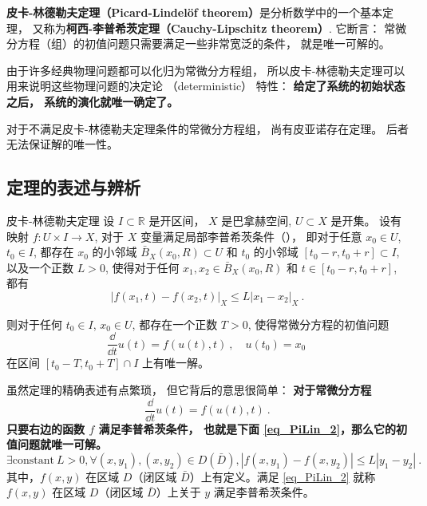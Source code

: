 
\textbf{皮卡-林德勒夫定理（Picard-Lindelöf theorem）}是分析数学中的一个基本定理， 又称为\textbf{柯西-李普希茨定理（Cauchy-Lipschitz theorem）}. 它断言： 常微分方程（组）的初值问题只需要满足一些非常宽泛的条件， 就是唯一可解的。 

由于许多经典物理问题都可以化归为常微分方程组， 所以皮卡-林德勒夫定理可以用来说明这些物理问题的决定论 （deterministic） 特性： \textbf{给定了系统的初始状态之后， 系统的演化就唯一确定了。}

对于不满足皮卡-林德勒夫定理条件的常微分方程组， 尚有皮亚诺存在定理。 后者无法保证解的唯一性。

\subsection{定理的表述与辨析}
\begin{theorem}{皮卡-林德勒夫定理}
设 $I\subset\mathbb{R}$ 是开区间， $X$ 是巴拿赫空间, $U\subset X$ 是开集。 设有映射 $f:U\times I\to X$, 对于 $X$ 变量满足局部李普希茨条件（）， 即对于任意 $x_0\in U$, $t_0\in I$, 都存在 $x_0$ 的小邻域 $\bar B_X(x_0,R)\subset U$ 和 $t_0$ 的小邻域 $[t_0-r,t_0+r]\subset I$, 以及一个正数 $L>0$, 使得对于任何 $x_1,x_2\in \bar B_X(x_0,R)$ 和 $t\in[t_0-r,t_0+r]$, 都有
$$
|f(x_1,t)-f(x_2,t)|_X\leq L|x_1-x_2|_X~.
$$

则对于任何 $t_0\in I$, $x_0\in U$, 都存在一个正数 $T>0$, 使得常微分方程的初值问题
$$
\frac{\dd}{\dd t}u(t)=f(u(t),t)~,\quad u(t_0)=x_0~
$$
在区间 $[t_0-T,t_0+T]\cap I$ 上有唯一解。
\end{theorem}

虽然定理的精确表述有点繁琐， 但它背后的意思很简单： \textbf{对于常微分方程}
\begin{equation}\label{eq_PiLin_1}
\frac{\dd}{\dd t}u(t)=f(u(t),t)~.
\end{equation}
\textbf{只要右边的函数 $f$ 满足李普希茨条件， 也就是下面 \autoref{eq_PiLin_2}，那么它的初值问题就唯一可解。} 
\begin{equation}\label{eq_PiLin_2}
\exists \text{constant}\ L > 0, \forall (x, y_1), (x, y_2) \in D(\bar{D}), \left|f(x, y_1)-f(x, y_2)\right| \le L \left|y_1 - y_2\right| ~.
\end{equation}
其中，$f(x, y)$ 在区域 $D$（闭区域 $\bar{D}$）上有定义。满足 \autoref{eq_PiLin_2} 就称 $f(x, y)$ 在区域 $D$（闭区域 $\bar{D}$）上关于 $y$ 满足李普希茨条件。

